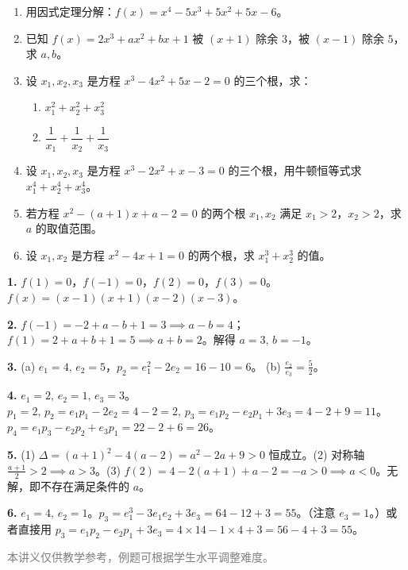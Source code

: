 \documentclass[12pt, a4paper]{ctexart}
\begin{document}
\begin{enumerate}
\item 用因式定理分解：$f(x) = x^4 - 5x^3 + 5x^2 + 5x - 6$。

\item 已知 $f(x) = 2x^3 + ax^2 + bx + 1$ 被 $(x+1)$ 除余 $3$，被 $(x-1)$ 除余 $5$，求 $a, b$。

\item 设 $x_1, x_2, x_3$ 是方程 $x^3 - 4x^2 + 5x - 2 = 0$ 的三个根，求：
\begin{enumerate}[label=(\alph*)]
\item $x_1^2 + x_2^2 + x_3^2$
\item $\dfrac{1}{x_1} + \dfrac{1}{x_2} + \dfrac{1}{x_3}$
\end{enumerate}

\item 设 $x_1, x_2, x_3$ 是方程 $x^3 - 2x^2 + x - 3 = 0$ 的三个根，用牛顿恒等式求 $x_1^4+x_2^4+x_3^4$。

\item 若方程 $x^2 - (a+1)x + a - 2 = 0$ 的两个根 $x_1, x_2$ 满足 $x_1 > 2$，$x_2 > 2$，求 $a$ 的取值范围。

\item 设 $x_1, x_2$ 是方程 $x^2 - 4x + 1 = 0$ 的两个根，求 $x_1^3 + x_2^3$ 的值。
\end{enumerate}

\vspace{10pt}
\begin{knowledgebox}[参考答案]
\textbf{1.} $f(1)=0$，$f(-1)=0$，$f(2)=0$，$f(3)=0$。$f(x)=(x-1)(x+1)(x-2)(x-3)$。

\textbf{2.} $f(-1)=-2+a-b+1=3 \implies a-b=4$；$f(1)=2+a+b+1=5 \implies a+b=2$。解得 $a=3,\, b=-1$。

\textbf{3.} (a) $e_1=4,\, e_2=5$，$p_2 = e_1^2-2e_2=16-10=6$。
(b) $\frac{e_2}{e_3} = \frac{5}{2}$。

\textbf{4.} $e_1=2,\, e_2=1,\, e_3=3$。$p_1=2,\, p_2=e_1p_1-2e_2=4-2=2,\, p_3=e_1p_2-e_2p_1+3e_3=4-2+9=11$。$p_4=e_1p_3-e_2p_2+e_3p_1=22-2+6=26$。

\textbf{5.} (1) $\Delta=(a+1)^2-4(a-2)=a^2-2a+9>0$ 恒成立。(2) 对称轴 $\frac{a+1}{2}>2 \implies a>3$。(3) $f(2)=4-2(a+1)+a-2=-a>0 \implies a<0$。无解，即不存在满足条件的 $a$。

\textbf{6.} $e_1=4,\, e_2=1$。$p_3 = e_1^3-3e_1e_2+3e_3 = 64-12+3 = 55$。（注意 $e_3=1$。）或者直接用 $p_3 = e_1 p_2 - e_2 p_1 + 3e_3 = 4 \times 14 - 1 \times 4 + 3 = 56-4+3=55$。
\end{knowledgebox}

\vfill
\begin{center}
\small\textcolor{gray}{本讲义仅供教学参考，例题可根据学生水平调整难度。}
\end{center}
\end{document}
